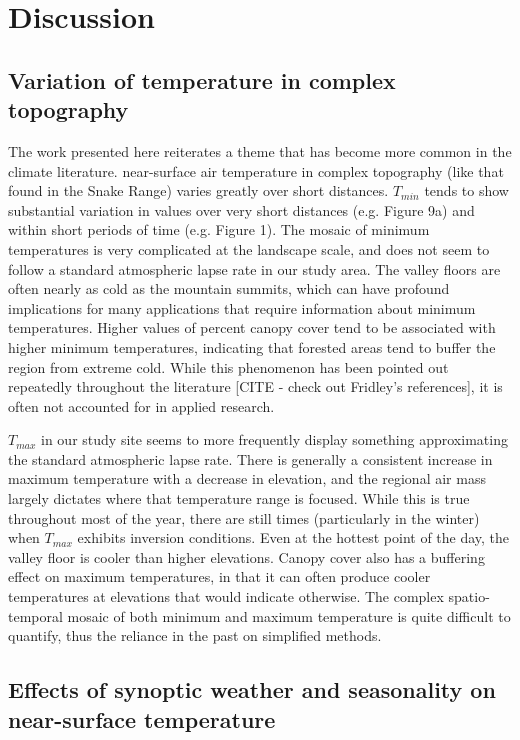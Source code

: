 \documentclass{ametsoc}
\begin{document}
\section{Discussion}
\subsection{Variation of temperature in complex topography}
The work presented here reiterates a theme that has become more common in the
climate literature. near-surface air temperature in complex topography (like
that found in the Snake Range) varies greatly over short distances. $T_{min}$
tends to show substantial variation in values over very short distances (e.g.
Figure 9a) and within short periods of time (e.g. Figure 1). The mosaic of
minimum temperatures is very complicated at the landscape scale, and does not
seem to follow a standard atmospheric lapse rate in our study area. The valley
floors are often nearly as cold as the mountain summits, which can have profound
implications for many applications that require information about minimum
temperatures. Higher values of percent canopy cover tend to be associated with
higher minimum temperatures, indicating that forested areas tend to buffer the
region from extreme cold. While this phenomenon has been pointed out repeatedly
throughout the literature [CITE - check out Fridley's references], it is often
not accounted for in applied research.

$T_{max}$ in our study site seems to more frequently display something approximating 
the standard atmospheric lapse rate. There is generally a consistent increase 
in maximum temperature with a decrease in elevation, and the regional air mass
largely dictates where that temperature range is focused. While this is true 
throughout most of the year, there are still times (particularly in the winter) 
when  $T_{max}$ exhibits inversion conditions. Even at the hottest point of the day,
the valley floor is cooler than higher elevations. Canopy cover also has a buffering 
effect on maximum temperatures, in that it can often produce cooler temperatures at 
elevations that would indicate otherwise. The complex spatio-temporal mosaic of both 
minimum and maximum temperature is quite difficult to quantify, thus the reliance in 
the past on simplified methods.

\subsection{Effects of synoptic weather and seasonality on near-surface temperature}
\end{document}
